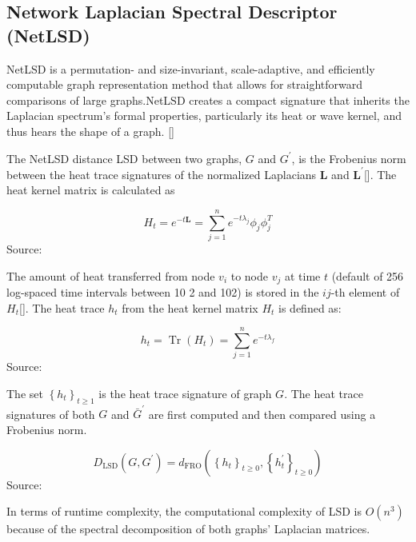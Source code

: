 \subsection{Network Laplacian Spectral Descriptor (NetLSD)}
NetLSD is a permutation- and size-invariant, scale-adaptive, and efficiently computable graph representation method that allows for straightforward comparisons of large graphs.NetLSD creates a compact signature that inherits the Laplacian spectrum's formal properties, particularly its heat or wave kernel, and thus hears the shape of a graph. [\cite{Tsitsulin:2018}]

The NetLSD distance LSD between two graphs, $G$ and $G^{\prime}$, is the Frobenius norm between the heat trace signatures of the normalized Laplacians $\mathbf{L}$ and $\mathbf{L}^{\prime}$[\cite{Tsitsulin:2018}]. The heat kernel matrix is calculated as

\begin{equation}
H_{t}=e^{-t \mathbf{L}}=\sum_{j=1}^{n} e^{-t \lambda_{j}} \phi_{j} \phi_{j}^{T}
\end{equation}
Source: \cite{Tsitsulin:2018}

The amount of heat transferred from node $v_{i}$ to node $v_{j}$ at time $t$ (default of 256 log-spaced time intervals between 10 2 and 102) is stored in the $i j$-th element of $H_{t}$[\cite{Tsitsulin:2018}]. The heat trace $h_{t}$ from the heat kernel matrix $H_{t}$ is defined as:

\begin{equation}
h_{t}=\operatorname{Tr}\left(H_{t}\right)=\sum_{j=1}^{n} e^{-t \lambda_{f}}  
\end{equation}
Source: \cite{Tsitsulin:2018}

The set $\left\{h_{t}\right\}_{t \geq 1}$ is the heat trace signature of graph $G$. The heat trace signatures of both $G$ and $\bar{G}^{\prime}$ are first computed and then compared using a Frobenius norm.

\begin{equation}
D_{\mathrm{LSD}}\left(G, G^{\prime}\right)=d_{\mathrm{FRO}}\left(\left\{h_{t}\right\}_{t \geq 0},\left\{h_{t}^{\prime}\right\}_{t \geq 0}\right)
\end{equation}
Source: \cite{Tsitsulin:2018}

In terms of runtime complexity, the computational complexity of LSD is $O\left(n^{3}\right)$ because of the spectral decomposition of both graphs' Laplacian matrices.

